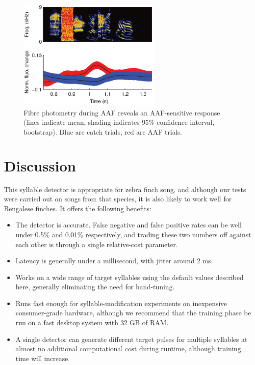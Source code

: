 \documentclass[10pt,letterpaper]{article}
\begin{document}
\begin{figure}
  \begin{center}
    \includegraphics[width=7cm]{Fig9}
  \end{center}
  \caption{Fibre photometry during AAF reveals an AAF-sensitive response
  (lines indicate mean, shading indicates 95\% confidence interval, bootstrap).
  Blue are catch trials, red are AAF trials.}
  \label{fig:fp-results}
\end{figure}

\section{Discussion}
\label{sec:conclusion}

This syllable detector is appropriate for zebra finch song, and
although our tests were carried out on songs from that species, it is
also likely to work well for Bengalese finches.  It offers the
following benefits:
\begin{itemize}
\item The detector is accurate. False negative and false positive
  rates can be well under 0.5\% and 0.01\% respectively, and trading
  these two numbers off against each other is through a single
  relative-cost parameter.
\item Latency is generally under a millisecond, with jitter around 2
  ms.
\item Works on a wide range of target syllables using the default
  values described here, generally eliminating the need for
  hand-tuning.
\item Runs fast enough for syllable-modification experiments on
  inexpensive consumer-grade hardware, although we recommend that the
  training phase be run on a fast desktop system with 32 GB of RAM.
\item A single detector can generate different target pulses for
  multiple syllables at almost no additional computational cost during
  runtime, although training time will increase.
\end{itemize}
\end{document}

